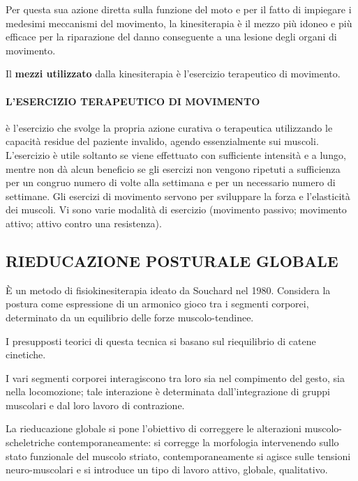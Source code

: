 Per questa sua azione diretta sulla funzione del moto e per il fatto di
impiegare i medesimi meccanismi del movimento, la kinesiterapia è il
mezzo più idoneo e più efficace per la riparazione del danno conseguente
a una lesione degli organi di movimento.

 
Il \textbf{mezzi utilizzato} dalla kinesiterapia è l'esercizio
terapeutico di movimento.
 


\paragraph{L'ESERCIZIO TERAPEUTICO DI MOVIMENTO}
   è l'esercizio che
  svolge la propria azione curativa o terapeutica utilizzando le
  capacità residue del paziente invalido, agendo essenzialmente sui
  muscoli. L'esercizio è utile soltanto se viene effettuato con
  sufficiente intensità e a lungo, mentre non dà alcun beneficio se gli
  esercizi non vengono ripetuti a sufficienza per un congruo numero di
  volte alla settimana e per un necessario numero di settimane. Gli
  esercizi di movimento servono per sviluppare la forza e l'elasticità
  dei muscoli. Vi sono varie modalità di esercizio (movimento passivo;
  movimento attivo; attivo contro una resistenza).


 
\subsection{RIEDUCAZIONE POSTURALE GLOBALE}

 

È un metodo di fisiokinesiterapia ideato da Souchard nel 1980. Considera
la postura come espressione di un armonico gioco tra i segmenti
corporei, determinato da un equilibrio delle forze muscolo-tendinee.

I presupposti teorici di questa tecnica si basano sul riequilibrio di
catene cinetiche.

I vari segmenti corporei interagiscono tra loro sia nel compimento del
gesto, sia nella locomozione; tale interazione è determinata
dall'integrazione di gruppi muscolari e dal loro lavoro di contrazione.

La rieducazione globale si pone l'obiettivo di correggere le alterazioni
muscolo-scheletriche contemporaneamente: si corregge la morfologia
intervenendo sullo stato funzionale del muscolo striato,
contemporaneamente si agisce sulle tensioni neuro-muscolari e si
introduce un tipo di lavoro attivo, globale, qualitativo.

